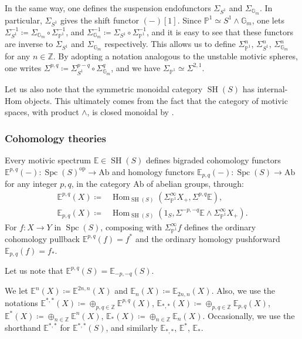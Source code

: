 \documentclass[10pt]{amsart}
\theoremstyle{definition}
\theoremstyle{plain}
\numberwithin{equation}{section}
\newcommand{\0}{\emptyset}
\newcommand{\E}{{\mathbb E}}
\newcommand{\G}{{\mathbb G}}
\renewcommand{\P}{{\mathbb P}}
\newcommand{\Z}{{\mathbb Z}}
\newcommand{\SH}{{\operatorname{SH}}}
\newcommand{\Spc}{{\operatorname{Spc}}}
\newcommand{\Hom}{{\operatorname{Hom}}}
\begin{document}
In the same way, one defines the suspension endofunctors $\Sigma_{S^1}$ and $\Sigma_{\G_m}$. In particular, $\Sigma_{S^1}$ gives the shift functor $(-)[1]$. Since $\P^1 \simeq S^1 \wedge \G_m$, one lets $\Sigma_{S^1}^{-1} \coloneqq \Sigma_{\G_m} \circ \Sigma_{\P^1}^{-1}$, and $\Sigma_{\G_m}^{-1} \coloneqq \Sigma_{S^1} \circ \Sigma_{\P^1}^{-1}$, and it is easy to see that these functors are inverse to $\Sigma_{S^1}$ and $\Sigma_{\G_m}$ respectively. This allows us to define $\Sigma_{\P^1}^n$, $\Sigma_{S^1}^n$, $\Sigma_{\G_m}^n$ for any $n \in \Z$. By adopting a notation analogous to the unstable motivic spheres, one writes $\Sigma^{p,q}\coloneqq \Sigma_{S^1}^{p-q}\circ \Sigma_{\G_m}^q$, and we have $\Sigma_{\P^1} \simeq \Sigma^{2,1}$.

Let us also note that the symmetric monoidal category $\SH(S)$ has internal-Hom objects. This ultimately comes from the fact that the category of motivic spaces, with product $\wedge$, is closed monoidal by \cite[Theorem 3.7]{voe:homotopy_theory}.

\subsubsection{Cohomology theories}
\label{subsection:cohomologyTheories}

Every motivic spectrum $\E \in \SH(S)$ defines bigraded cohomology functors $\E^{p,q}(-): \Spc(S)^{\text{op}} \to \text{Ab}$ and homology functors $\E_{p,q}(-): \Spc(S) \to \text{Ab}$ for any integer $p,q$, in the category $\text{Ab}$ of abelian groups, through:
\begin{align*}
    \E^{p,q}(X) \coloneqq & \Hom_{\SH(S)}(\Sigma_{\P^1}^\infty X_+, \Sigma^{p,q}\E),\\
    \E_{p,q}(X) \coloneqq & \Hom_{\SH(S)}(1_S, \Sigma^{-p,-q}\E \wedge \Sigma_{\P^1}^\infty X_+).
\end{align*}
For $f:X \to Y$ in $\Spc(S)$, composing with $\Sigma_{\P^1}^\infty f$ defines the ordinary cohomology pullback $\E^{p,q}(f)=f^*$ and the ordinary homology pushforward $\E_{p,q}(f)=f_*$.

Let us note that $\E^{p,q}(S)=\E_{-p,-q}(S)$.

We let $\E^n(X) \coloneqq \E^{2n,n}(X)$ and $\E_n(X) \coloneqq \E_{2n,n}(X)$. Also, we use the notations $\E^{*,*}(X)\coloneqq \oplus_{p,q \in \Z}\E^{p,q}(X)$, $\E_{*,*}(X)\coloneqq \oplus_{p,q \in \Z}\E_{p,q}(X)$, $\E^*(X)\coloneqq \oplus_{n \in \Z}\E^n(X)$, $\E_*(X)\coloneqq \oplus_{n \in \Z}\E_n(X)$. Occasionally, we use the shorthand $\E^{*,*}$ for $\E^{*,*}(S)$, and similarly $\E_{*,*}$, $\E^*$, $\E_*$. 
\end{document}
